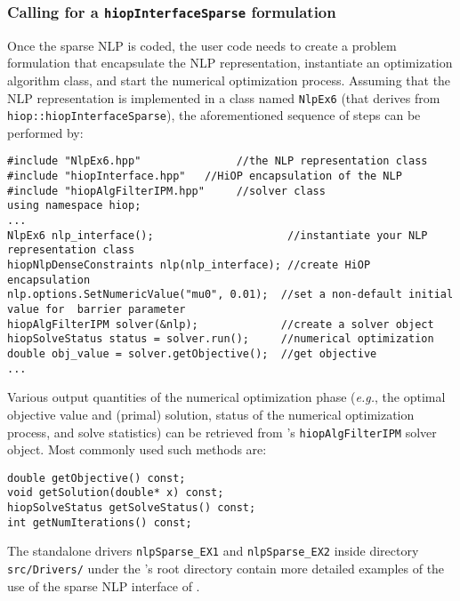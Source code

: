 \subsubsection{Calling \Hi for a \texttt{hiopInterfaceSparse} formulation}
Once the sparse NLP is coded,  the  user code needs to create a \Hi problem formulation that encapsulate the NLP representation, instantiate an optimization algorithm class, and start the numerical optimization process. Assuming that the NLP representation is implemented in a class named \texttt{NlpEx6} (that derives from \texttt{hiop::hiopInterfaceSparse}), the aforementioned sequence of steps can be performed by:
\begin{lstlisting}
#include "NlpEx6.hpp"               //the NLP representation class
#include "hiopInterface.hpp"   //HiOP encapsulation of the NLP
#include "hiopAlgFilterIPM.hpp"     //solver class
using namespace hiop;
...
NlpEx6 nlp_interface();                     //instantiate your NLP representation class
hiopNlpDenseConstraints nlp(nlp_interface); //create HiOP encapsulation
nlp.options.SetNumericValue("mu0", 0.01);  //set a non-default initial value for  barrier parameter
hiopAlgFilterIPM solver(&nlp);             //create a solver object
hiopSolveStatus status = solver.run();     //numerical optimization
double obj_value = solver.getObjective();  //get objective
...
\end{lstlisting}
Various output quantities of the numerical optimization phase (\textit{e.g.}, the optimal objective value and (primal) solution, status of the numerical optimization process, and solve statistics) can be retrieved from \Hi's \texttt{hiopAlgFilterIPM} solver object. Most commonly used such methods are: 
\begin{lstlisting}
double getObjective() const;
void getSolution(double* x) const;
hiopSolveStatus getSolveStatus() const;
int getNumIterations() const;
\end{lstlisting} 
The standalone drivers \texttt{nlpSparse\_EX1} and \texttt{nlpSparse\_EX2} inside directory \texttt{src/Drivers/} under the \Hi's root directory contain more detailed examples of the use of the sparse NLP interface of \Hi.

